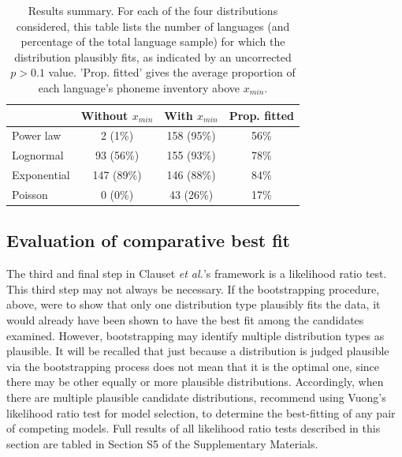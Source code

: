 \begin{table}

\caption{\label{tab:results-summary}Results summary. For each of the four distributions considered, this table lists the number of languages (and percentage of the total language sample) for which the distribution plausibly fits, as indicated by an uncorrected $p > 0.1$ value. 'Prop. fitted' gives the average proportion of each language's phoneme inventory above $x_{min}$.}
\centering
\begin{tabular}[t]{lccc}
\toprule
\textbf{ } & \textbf{Without $x_{min}$} & \textbf{With $x_{min}$} & \textbf{Prop. fitted}\\
\midrule
Power law & 2 (1\%) & 158 (95\%) & 56\%\\
Lognormal & 93 (56\%) & 155 (93\%) & 78\%\\
Exponential & 147 (89\%) & 146 (88\%) & 84\%\\
Poisson & 0 (0\%) & 43 (26\%) & 17\%\\
\bottomrule
\end{tabular}
\end{table}

\hypertarget{evaluation-of-comparative-best-fit}{%
\subsection{Evaluation of comparative best fit}\label{evaluation-of-comparative-best-fit}}

The third and final step in Clauset \emph{et al.}'s \autocite*{clauset_power-law_2009} framework is a likelihood ratio test. This third step may not always be necessary. If the bootstrapping procedure, above, were to show that only one distribution type plausibly fits the data, it would already have been shown to have the best fit among the candidates examined. However, bootstrapping may identify multiple distribution types as plausible. It will be recalled that just because a distribution is judged plausible via the bootstrapping process does not mean that it is the optimal one, since there may be other equally or more plausible distributions. Accordingly, when there are multiple plausible candidate distributions, \textcite{clauset_power-law_2009} recommend using Vuong's \autocite*{vuong_likelihood_1989} likelihood ratio test for model selection, to determine the best-fitting of any pair of competing models. Full results of all likelihood ratio tests described in this section are tabled in Section S5 of the Supplementary Materials.

